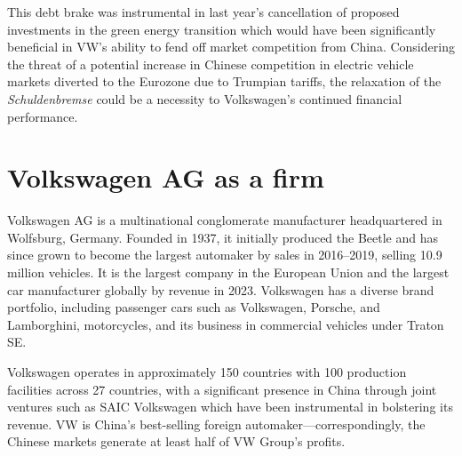 \documentclass[10pt]{article}
\begin{document}
This debt brake was instrumental in last year's  cancellation of proposed investments in the green energy transition which would have been significantly beneficial in VW's ability to fend off market competition from China. Considering the threat of a potential increase in Chinese competition in electric vehicle markets diverted to the Eurozone due to Trumpian tariffs, the relaxation of the \textit{Schuldenbremse} could be a necessity to Volkswagen's continued financial performance.

\newpage

\section{Volkswagen AG as a firm}


Volkswagen AG is a multinational conglomerate manufacturer headquartered in Wolfsburg, Germany. Founded in 1937, it initially produced the Beetle and has since grown to become the largest automaker by sales in 2016--2019, selling 10.9 million vehicles. It is the largest company in the European Union and the largest car manufacturer globally by revenue in 2023. Volkswagen has a diverse brand portfolio, including passenger cars such as Volkswagen, Porsche, and Lamborghini, motorcycles, and its business in commercial vehicles under Traton SE\autocite{vwgroupHistory1999}.

Volkswagen operates in approximately 150 countries with 100 production facilities across 27 countries, with a significant presence in China through joint ventures such as SAIC Volkswagen which have been instrumental in bolstering its revenue. VW is China's best-selling foreign automaker---correspondingly, the Chinese markets generate at least half of VW Group's profits\autocite{whiteVWAuditXinjiang2024}.
\end{document}
